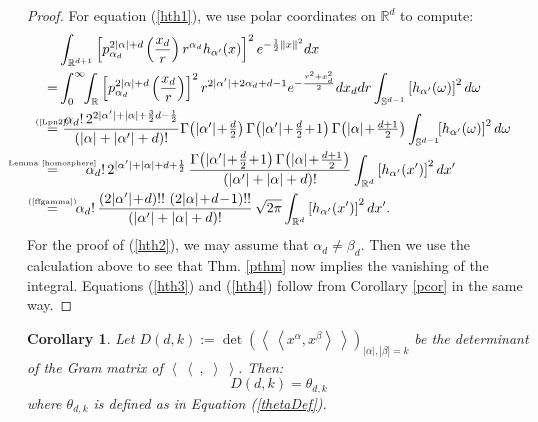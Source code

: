 \documentclass{amsart}
\newcommand{\p}[2]{p_{#1}^{#2}\;\!\!}
\newcommand{\bra}{\left<\!\!\!\:\left<}
\newcommand{\ket}{\right>\!\!\!\:\right>}
\newcommand{\myeq}[1]{\mathrel{\overset{\makebox[0pt]{\text{\tiny #1}}}{=}}}
\newcommand{\R}{\mathbb{R}}
\renewcommand{\S}{\mathbb{S}}
\theoremstyle{plain}
\newtheorem{corollary}[theorem]{Corollary}
\theoremstyle{definition}
\theoremstyle{remark}
\begin{document}
\begin{proof}
For equation (\ref{hth1}), we use polar coordinates on $\R ^d$ to compute:
\begin{align*}
 &\int_{\R^{d+1}}\left[\p{\alpha_d}{2|\alpha|+d}\left(\frac{x_d}{r}\right) r^{\alpha_d}h_{\alpha'}(x)\right]^2 e^{-\frac{1}{2}\|x\|^2} dx \\
 = & \int_0^\infty\!\!\int_{\R} \left[\p{\alpha_d}{2|\alpha|+d}\left(\frac{x_d}{r}\right)\right]^2 r^{2|\alpha'|+2\alpha_d+d-1} e^{-\frac{r^2+x_d^2}{2} }dx_ddr\int_{\S^{d-1}}\left[h_{\alpha'}(\omega)\right]^2 d\omega \\
\myeq{(\ref{Lpn2})}& \  \frac{\alpha_d!\, 2^{2|\alpha '|+|\alpha|+\frac{3}{2}d-\frac{1}{2}} }{\left(|\alpha|+|\alpha'|+d\right)!} { \textstyle
\Gamma\!\left( |\alpha'| \!+\!\frac{d}{2}\right)\Gamma\!\left( |\alpha'|\!+\! \frac{d}{2}\!+\! 1\right) \Gamma\!\left( |\alpha| \!+\! \frac{d+1}{2}\right) }\int_{\S^{d-1}}\!\!\left[h_{\alpha'}(\omega)\right]^2 d\omega \\
\myeq{Lemma~\ref{homosphere}}&\quad\quad \alpha_d!\,2^{|\alpha '|+|\alpha |+d+\frac{1}{2}}\,
\frac{\Gamma\!\left(|\alpha '|\!+\!\frac{d}{2}\!+\!1\right)\Gamma\!\left(|\alpha |\!+\!\tfrac{d+1}{2}\right)}{\left(|\alpha '|+|\alpha |+d\right)!} \int_{\R^d} \left[h_{\alpha'}(x')\right]^2 dx' \\
\myeq{(\ref{ffgamma})}& \quad\; 
\alpha_d!\,\frac{\left(2|\alpha '|\!+\!d\right)!!\,\left(2|\alpha |\!+\!d\!-\!1\right)!!}{\left(|\alpha '|+|\alpha |+d\right)!}\, \sqrt{2\pi}\int_{\R^d} \left[h_{\alpha'}(x')\right]^2 dx' .
\end{align*}
For the proof of (\ref{hth2}), we may assume that $\alpha_d \neq \beta_d$. Then we use the calculation above to see that Thm. \ref{pthm} now implies the vanishing of the integral. Equations (\ref{hth3}) and (\ref{hth4}) follow from Corollary \ref{pcor} in the same way.
\end{proof}
\begin{corollary}\label{thetaCor} Let $D(d,k):=\det\left(\bra x^\alpha ,x^\beta \ket\right)_{|\alpha|,|\beta|=k} $ be the determinant of the Gram matrix of $\bra\ ,\;\ket$. Then:
$$
D(d,k) = \theta_{d,k}
$$
where $\theta_{d,k}$ is defined as in Equation (\ref{thetaDef}).
\end{corollary}
\end{document}
